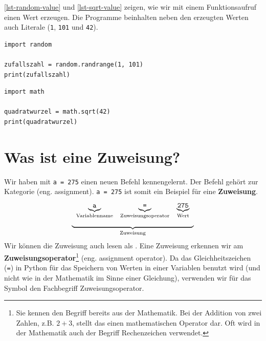 \begin{example}

\autoref{lst-random-value} und \autoref{lst-sqrt-value} zeigen, wie wir mit einem Funktionsaufruf einen Wert erzeugen. Die Programme beinhalten neben den erzeugten Werten auch Literale (\lstinline{1}, \lstinline{101} und \lstinline{42}). 

\begin{lstlisting}[caption={Erzeugt eine Zufallszahl zwischen $1$ und $100$ und gibt diese dann in der Konsole aus.}, label={lst-random-value}]
import random

zufallszahl = random.randrange(1, 101)
print(zufallszahl)
\end{lstlisting}
	
\begin{lstlisting}[caption={Berechnet die Quadratwurzel aus $42$ und gibt diese dann in der Konsole aus.}, label={lst-sqrt-value}]
import math

quadratwurzel = math.sqrt(42)
print(quadratwurzel)
	\end{lstlisting}
\end{example}

\section{Was ist eine Zuweisung?}

Wir haben mit \lstinline{a = 275} einen neuen Befehl kennengelernt. Der Befehl gehört zur Kategorie  (eng. assignment). \lstinline{a = 275} ist somit ein Beispiel für eine \textbf{Zuweisung}.
$$
\begin{array}[t]{c}
\begin{array}[t]{ccc} 
\underbrace{\textrm{\texttt{a}}}_{\textrm{Variablenname}} & \underbrace{\textrm{\texttt{=}}}_{\textrm{Zuweisungsoperator}} & \underbrace{\textrm{\texttt{275}}}_{\textrm{Wert}}
\end{array} \\
\underbrace{\hspace{6cm}}_{\textrm{Zuweisung}}
\end{array}
$$
Wir können die Zuweisung auch lesen als . Eine Zuweisung erkennen wir am \textbf{Zuweisungsoperator}\footnote{Sie kennen den Begriff bereits aus der Mathematik. Bei der Addition von zwei Zahlen, z.B. $2 + 3$, stellt das  einen mathematischen Operator dar. Oft wird in der Mathematik auch der Begriff Rechenzeichen verwendet.} (eng. assignment operator). Da das Gleichheitszeichen (\lstinline{=}) in Python für das Speichern von Werten in einer Variablen benutzt wird (und nicht wie in der Mathematik im Sinne einer Gleichung), verwenden wir für das Symbol den Fachbegriff Zuweisungsoperator.


